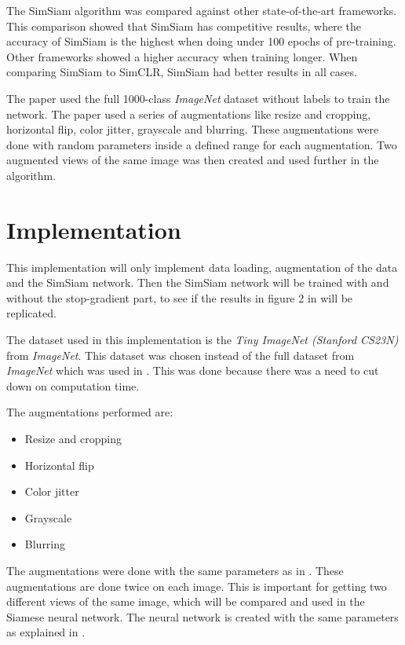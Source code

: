 \documentclass[12pt]{article}
\begin{document}
The SimSiam algorithm was compared against other state-of-the-art frameworks. This comparison showed that SimSiam has competitive results,
where the accuracy of SimSiam is the highest when doing under 100 epochs of pre-training. Other frameworks showed a higher accuracy when
training longer. When comparing SimSiam to SimCLR, SimSiam had better results in all cases.

The paper used the full 1000-class \textit{ImageNet} dataset without labels to train the network. The paper used a series of augmentations
like resize and cropping, horizontal flip, color jitter, grayscale and blurring. These augmentations were done with random parameters inside
a defined range for each augmentation. Two augmented views of the same image was then created and used further in the algorithm.

\section*{Implementation}
This implementation will only implement data loading, augmentation of the data and the SimSiam network.
Then the SimSiam network will be trained with and without the stop-gradient
part, to see if the results in figure 2 in \cite{chen2021exploring} will be replicated.

The dataset used in this implementation is the \textit{Tiny ImageNet (Stanford CS23N)} from \textit{ImageNet}. This dataset was chosen instead
of the full dataset from \textit{ImageNet} which was used in \cite{chen2021exploring}. This was done because there was a need to cut down
on computation time.

The augmentations performed are:
\begin{itemize}
    \item Resize and cropping
    \item Horizontal flip
    \item Color jitter
    \item Grayscale
    \item Blurring
\end{itemize}

The augmentations were done with the same parameters as in \cite{chen2021exploring}. These augmentations are done twice on
each image. This is important for getting two different views of the same image, which will be compared and used in the Siamese neural
network. The neural network is created with the same parameters as explained in \cite{chen2021exploring}.
\end{document}
